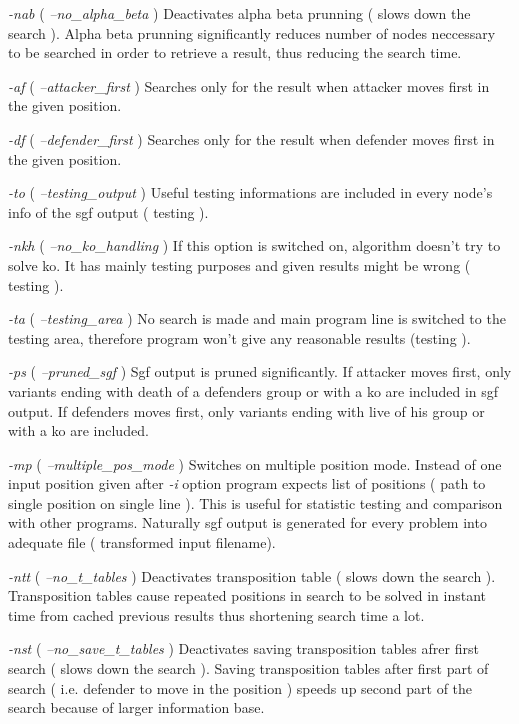 \begin{description}
	\item {\it -nab} ( {\it --no\_alpha\_beta} ) Deactivates alpha beta prunning ( slows down the search ). Alpha beta prunning significantly reduces
		number of nodes neccessary to be searched in order to retrieve a result, thus reducing the search time. 
	\item {\it -af} ( {\it --attacker\_first} ) Searches only for the result when attacker moves first in the given position. 
	\item {\it -df} ( {\it --defender\_first} ) Searches only for the result when defender moves first in the given position. 
	\item {\it -to} ( {\it --testing\_output} ) Useful testing informations are included in every node's info of the sgf output ( testing ). 
	\item {\it -nkh} ( {\it --no\_ko\_handling} ) If this option is switched on, algorithm doesn't try to solve ko. It has mainly testing purposes and
		given results might be wrong ( testing ).
	\item {\it -ta} ( {\it --testing\_area} ) No search is made and main program line is switched to the testing area, therefore program won't give any
		reasonable results (testing ). 
	\item {\it -ps} ( {\it --pruned\_sgf} ) Sgf output is pruned significantly. If attacker moves first, only variants ending with death of a
		defenders group or with a ko are included in sgf output. If defenders moves first, only variants ending with live of his group or with a ko are
		included.
	\item {\it -mp} ( {\it --multiple\_pos\_mode} ) Switches on multiple position mode. Instead of one input position given after {\it -i} option
		program expects list of positions ( path to single position on single line ). This is useful for statistic testing and comparison with other
		programs. Naturally sgf output is generated for every problem into adequate file ( transformed input filename).
	\item {\it -ntt} ( {\it --no\_t\_tables} ) Deactivates transposition table ( slows down the search ). Transposition tables cause repeated positions in
	search to be solved in instant time from cached previous results thus shortening search time a lot.
	\item {\it -nst} ( {\it --no\_save\_t\_tables} ) Deactivates saving transposition tables afrer first search ( slows down the search ). Saving transposition
	tables after first part of search ( i.e. defender to move in the position ) speeds up second part of the search because of larger information base.

\end{description}

